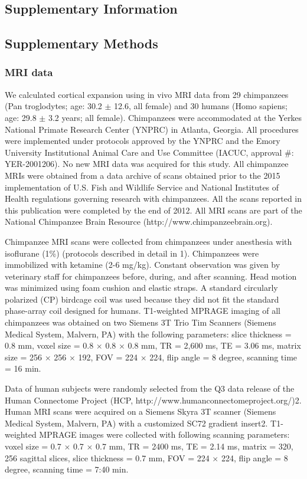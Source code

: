 \begin{refsection}
\newpage
\section*{Supplementary Information}
\subsection*{Supplementary Methods}
\subsubsection*{MRI data}
We calculated cortical expansion using in vivo MRI data from 29 chimpanzees (Pan troglodytes; age: 30.2 $\pm$ 12.6, all female) and 30 humans (Homo sapiens; age: 29.8 $\pm$ 3.2 years; all female). Chimpanzees were accommodated at the Yerkes National Primate Research Center (YNPRC) in Atlanta, Georgia. All procedures were implemented under protocols approved by the YNPRC and the Emory University Institutional Animal Care and Use Committee (IACUC, approval \#: YER-2001206). No new MRI data was acquired for this study. All chimpanzee MRIs were obtained from a data archive of scans obtained prior to the 2015 implementation of U.S. Fish and Wildlife Service and National Institutes of Health regulations governing research with chimpanzees. All the scans reported in this publication were completed by the end of 2012. All MRI scans are part of the National Chimpanzee Brain Resource (http://www.chimpanzeebrain.org).

Chimpanzee MRI scans were collected from chimpanzees under anesthesia with isoflurane (1\%) (protocols described in detail in 1). Chimpanzees were immobilized with ketamine (2-6 mg/kg). Constant observation was given by veterinary staff for chimpanzees before, during, and after scanning. Head motion was minimized using foam cushion and elastic straps. A standard circularly polarized (CP) birdcage coil was used because they did not fit the standard phase-array coil designed for humans. T1-weighted MPRAGE imaging of all chimpanzees was obtained on two Siemens 3T Trio Tim Scanners (Siemens Medical System, Malvern, PA) with the following parameters: slice thickness = 0.8 mm, voxel size = 0.8 $\times$ 0.8 $\times$ 0.8 mm, TR = 2,600 ms, TE = 3.06 ms, matrix size = 256 $\times$ 256 $\times$ 192, FOV = 224 $\times$ 224, flip angle = 8 degree, scanning time = 16 min.

Data of human subjects were randomly selected from the Q3 data release of the Human Connectome Project (HCP, http://www.humanconnectomeproject.org/)2. Human MRI scans were acquired on a Siemens Skyra 3T scanner (Siemens Medical System, Malvern, PA) with a customized SC72 gradient insert2. T1-weighted MPRAGE images were collected with following scanning parameters: voxel size = 0.7 $\times$ 0.7 $\times$ 0.7 mm, TR = 2400 ms, TE = 2.14 ms, matrix = 320, 256 sagittal slices, slice thickness = 0.7 mm, FOV = 224 $\times$ 224, flip angle = 8 degree, scanning time = 7:40 min.


\end{refsection}
